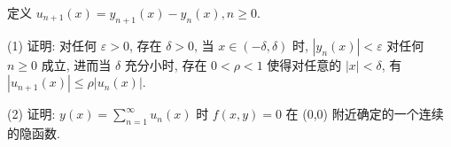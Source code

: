 定义 $u_{n + 1}(x) = y_{n + 1}(x) - y_n(x), n \geq 0.$\par
(1) 证明: 对任何 $\varepsilon > 0$, 存在 $\delta > 0$, 当 $x \in (-\delta, \delta)$ 时, $|y_n(x)| < \varepsilon$ 对任何 $n \geq 0$ 成立, 进而当 $\delta$ 充分小时, 存在 $0 < \rho < 1$ 使得对任意的 $|x| < \delta$, 有 $|u_{n+1}(x)| \leq \rho |u_n(x)|$.\par
(2) 证明: $y(x) = \sum_{n=1}^{\infty} u_n(x)$ 时 $f(x, y) = 0$ 在 (0,0) 附近确定的一个连续的隐函数.\par

